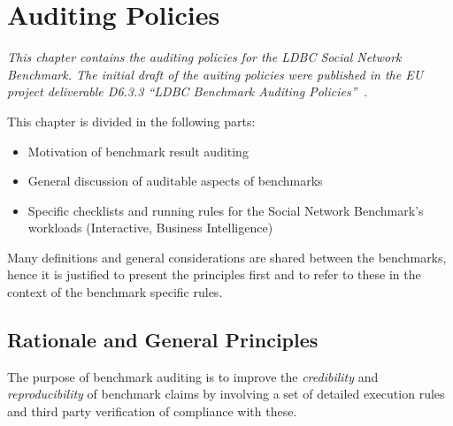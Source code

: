 \chapter{Auditing Policies}
\label{sec:auditing}

\emph{This chapter contains the auditing policies for the LDBC Social Network Benchmark. The initial draft of the auiting policies were published in the EU project deliverable D6.3.3 ``LDBC Benchmark Auditing Policies''~\cite{LdbcAuditingPoliciesDeliverable}.}


This chapter is divided in the following parts:
\begin{itemize}
    \item Motivation of benchmark result auditing
    \item General discussion of auditable aspects of benchmarks
    \item Specific checklists and running rules for the Social Network Benchmark's workloads (Interactive, Business Intelligence)
\end{itemize}
Many definitions and general considerations are shared between the benchmarks, hence it is justified to present the principles first and to refer to these in the context of the benchmark specific rules.


\section{Rationale and General Principles}


The purpose of benchmark auditing is to improve the \emph{credibility} and \emph{reproducibility} of benchmark claims by involving a set of detailed execution rules and third party verification of compliance with these.

